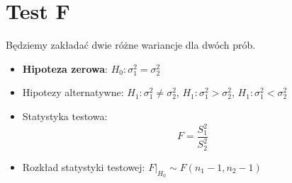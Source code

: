 \documentclass{../notatki}
\begin{document}
\section{Test F}

Będziemy zakładać dwie różne wariancje dla dwóch prób.

\begin{itemize}
  \item \textbf{Hipoteza zerowa}: $H_0: \sigma_1^2 = \sigma_2^2$
  \item Hipotezy alternatywne: $H_1: \sigma_1^2 \neq \sigma_2^2$, $H_1:
    \sigma_1^2 > \sigma_2^2$, $H_1: \sigma_1^2 < \sigma_2^2$
  \item Statystyka testowa:
    $$
    F = \frac{S_1^2}{S_2^2}
    $$
  \item Rozkład statystyki testowej: $F|_{H_0} \sim F(n_1 - 1, n_2 - 1)$
\end{itemize}
\end{document}
